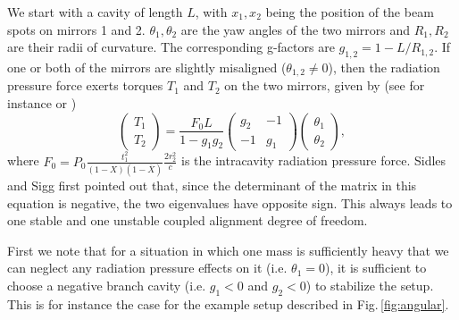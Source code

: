 We start with a cavity of length $L$, with $x_1,x_2$  being the position of the beam spots on mirrors 1 and 2. $\theta_1,\theta_2$ are the yaw angles of the two mirrors and $R_1,R_2$ are their radii of curvature. The corresponding g-factors are $g_{1,2}=1-L/R_{1,2}$.
If one or both of the mirrors are slightly misaligned ($\theta_{1,2}\neq 0$), then the radiation pressure force exerts torques $T_1$ and $T_2$ on the two mirrors, given by (see for instance \cite{Sidles06} or \cite{Ballmer13})
\begin{equation}
\label{SidlesSigg_Basic}
\left(
\begin{array}{c}
T_1\\
T_2
\end{array}
\right)
=
\frac{F_0 L}{1-g_1 g_2}
\left(
\begin{array}{cc}
g_2 & -1\\
-1 & g_1
\end{array}
\right)
\left(
\begin{array}{c}
\theta_1\\
\theta_2
\end{array}
\right),
\end{equation} 
where $F_0=P_0\frac{t_1^2}{(1-X)(1-\overline{X})} \frac{2 r_2^2}{c}$ is the intracavity radiation pressure force. Sidles and Sigg first pointed out that, since the determinant of the matrix in this equation
 is negative, the two eigenvalues have opposite sign. This always leads to one stable and one unstable coupled alignment degree of freedom.

First we note that for a situation in which one mass is sufficiently heavy that we can neglect any radiation pressure effects on it (i.e. $\theta_1=0$), it is sufficient to choose a negative branch cavity (i.e. $g_1<0$ and $g_2<0$) to stabilize the setup. This is for instance the case for the example setup described in Fig.\,\ref{fig:angular}.

